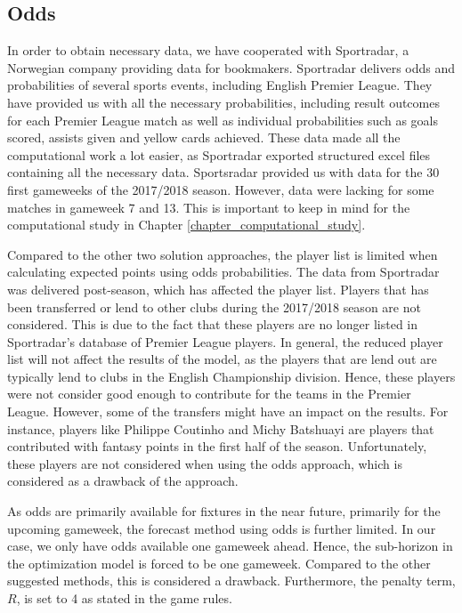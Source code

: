 \subsection{Odds}

In order to obtain necessary data, we have cooperated with Sportradar, a Norwegian company providing data for bookmakers. Sportradar delivers odds and probabilities of several sports events, including English Premier League. They have provided us with all the necessary probabilities, including result outcomes for each Premier League match as well as individual probabilities such as goals scored, assists given and yellow cards achieved. These data made all the computational work a lot easier, as Sportradar exported structured excel files containing all the necessary data. Sportsradar provided us with data for the 30 first gameweeks of the 2017/2018 season. However, data were lacking for some matches in gameweek 7 and 13. This is important to keep in mind for the computational study in Chapter \ref{chapter_computational_study}.

\newpar

Compared to the other two solution approaches, the player list is limited when calculating expected points using odds probabilities. The data from Sportradar was delivered post-season, which has affected the player list. Players that has been transferred or lend to other clubs during the 2017/2018 season are not considered. This is due to the fact that these players are no longer listed in Sportradar's database of Premier League players. In general, the reduced player list will not affect the results of the model, as the players that are lend out are typically lend to clubs in the English Championship division. Hence, these players were not consider good enough to contribute for the teams in the Premier League. However, some of the transfers might have an impact on the results. For instance, players like Philippe Coutinho and Michy Batshuayi are players that contributed with fantasy points in the first half of the season. Unfortunately, these players are not considered when using the odds approach, which is considered as a drawback of the approach. 

\newpar
As odds are primarily available for fixtures in the near future, primarily for the upcoming gameweek, the forecast method using odds is further limited. In our case, we only have odds available one gameweek ahead. Hence, the sub-horizon in the optimization model is forced to be one gameweek. Compared to the other suggested methods, this is considered a drawback. Furthermore, the penalty term, $R$, is set to 4 as stated in the game rules. 


